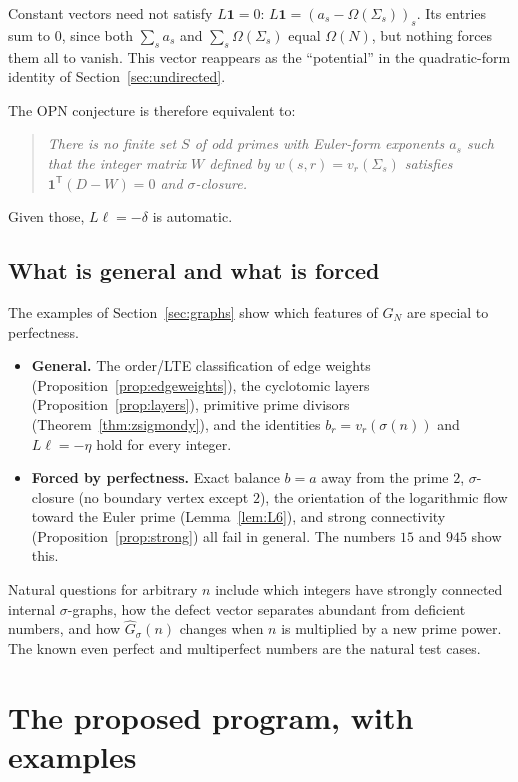 \documentclass[11pt]{article}
\theoremstyle{definition}
\theoremstyle{remark}
\newcommand{\one}{\mathbf{1}}
\begin{document}
Constant vectors need not satisfy $L\one=0$: $L\one=(a_s-\Omega(\Sigma_s))_s$.
Its entries sum to $0$, since both $\sum_s a_s$ and $\sum_s\Omega(\Sigma_s)$
equal $\Omega(N)$, but nothing forces them all to vanish.  This vector
reappears as the ``potential'' in the quadratic-form identity of
Section~\ref{sec:undirected}.

The OPN conjecture is therefore equivalent to:

\begin{quote}
\emph{There is no finite set $S$ of odd primes with Euler-form exponents
$a_s$ such that the integer matrix $W$ defined by
$w(s,r)=v_r(\Sigma_s)$ satisfies $\one^{\mathsf T}(D-W)=0$ and
$\sigma$-closure.}
\end{quote}
Given those, $L\ell=-\delta$ is automatic.

\subsection{What is general and what is forced}\label{sec:forced}

The examples of Section~\ref{sec:graphs} show which features of $G_N$ are
special to perfectness.
\begin{itemize}[leftmargin=1.5em]
\item \textbf{General.}  The order/LTE classification of edge weights
  (Proposition~\ref{prop:edgeweights}), the cyclotomic layers
  (Proposition~\ref{prop:layers}), primitive prime divisors
  (Theorem~\ref{thm:zsigmondy}), and the identities
  $b_r=v_r(\sigma(n))$ and $L\ell=-\eta$ hold for every integer.
\item \textbf{Forced by perfectness.}  Exact balance $b=a$ away from the
  prime $2$, $\sigma$-closure (no boundary vertex except $2$), the
  orientation of the logarithmic flow toward the Euler prime
  (Lemma~\ref{lem:L6}), and strong connectivity
  (Proposition~\ref{prop:strong}) all fail in general.  The numbers $15$ and
  $945$ show this.
\end{itemize}
Natural questions for arbitrary $n$ include which integers have strongly
connected internal $\sigma$-graphs, how the defect vector separates abundant
from deficient numbers, and how $\widehat G_\sigma(n)$ changes when $n$ is
multiplied by a new prime power.  The known even perfect and multiperfect
numbers are the natural test cases.

\section{The proposed program, with examples}\label{sec:program}
\end{document}
